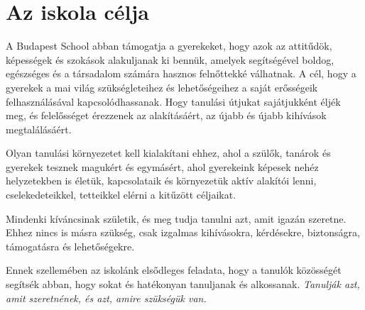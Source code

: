 \section{Az iskola célja}
\label{sec:iskola_celja}

A Budapest School abban támogatja a gyerekeket, hogy azok az
attitűdök, képességek és szokások alakuljanak ki bennük, amelyek segítségével
boldog, egészséges és a társadalom számára hasznos felnőttekké válhatnak. A
cél, hogy a gyerekek a mai világ szükségleteihez és lehetőségeihez a saját
erősségeik felhasználásával kapcsolódhassanak.	Hogy tanulási útjukat
sajátjukként éljék meg, és felelősséget érezzenek az alakításáért, az újabb és
újabb kihívások megtalálásáért.

Olyan tanulási környezetet kell kialakítani ehhez, ahol a szülők, tanárok és
gyerekek tesznek magukért és egymásért, ahol gyerekeink képesek nehéz
helyzetekben is életük, kapcsolataik és környezetük aktív alakítói lenni,
cselekedeteikkel, tetteikkel elérni a kitűzött céljaikat.

Mindenki kíváncsinak születik, és meg tudja tanulni azt, amit
igazán szeretne. Ehhez nincs is másra szükség, csak izgalmas kihívásokra, kérdésekre,
biztonságra, támogatásra és lehetőségekre.

Ennek szellemében az iskolánk elsődleges feladata, hogy a tanulók közösségét
segítsék abban, hogy sokat és hatékonyan tanuljanak és alkossanak.
\emph{Tanulják azt, amit szeretnének, és azt, amire szükségük van.}
